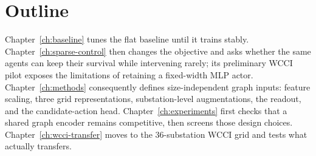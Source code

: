 \section{Outline}
\label{sec:intro-outline}

Chapter~\ref{ch:baseline} tunes the flat baseline until it trains stably.
Chapter~\ref{ch:sparse-control} then changes the objective and asks whether the
same agents can keep their survival while intervening rarely; its preliminary
WCCI pilot exposes the limitations of retaining a fixed-width MLP actor.
Chapter~\ref{ch:methods} consequently defines size-independent graph inputs:
feature scaling, three grid representations, substation-level augmentations,
the readout, and the candidate-action head. Chapter~\ref{ch:experiments} first
checks that a shared graph encoder remains competitive, then screens those
design choices. Chapter~\ref{ch:wcci-transfer} moves to the 36-substation WCCI
grid and tests what actually transfers.
